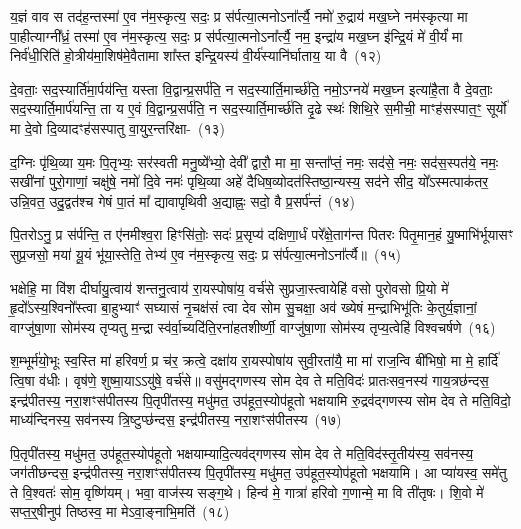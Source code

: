 य॒ज्ञं वाव स तद॑ह॒न्तस्मा॑ ए॒व न॑म॒स्कृत्य॒ सदः॒ प्र स॑र्पत्या॒त्मनो\-ऽना᳚र्त्यै॒ नमो॑ रु॒द्राय॑ मख॒घ्ने नम॑स्कृत्या मा पा॒हीत्याग्नी᳚ध्रं॒ तस्मा॑ ए॒व न॑म॒स्कृत्य॒ सदः॒ प्र स॑र्पत्या॒त्मनो\-ऽना᳚र्त्यै॒ नम॒ इन्द्रा॑य मख॒घ्न इ॑न्द्रि॒यं मे॑ वी॒र्यं॑ मा निर्व॑धी॒रिति॑ हो॒त्रीय॑मा॒शिष॑मे॒वैतामा शा᳚स्त इन्द्रि॒यस्य॑ वी॒र्य॑स्यानि॑र्घाताय॒ या वै~(१२)\ip

दे॒वताः॒ सद॒स्यार्ति॑मा॒र्पय॑न्ति॒ यस्ता वि॒द्वान्प्र॒सर्प॑ति॒ न सद॒स्यार्ति॒मार्च्छ॑ति॒ नमो॒\-ऽग्नये॑ मख॒घ्न इत्या॑है॒ता वै दे॒वताः॒ सद॒स्यार्ति॒मार्प॑यन्ति॒ ता य ए॒वं वि॒द्वान्प्र॒सर्प॑ति॒ न सद॒स्यार्ति॒मार्च्छ॑ति दृ॒ढे स्थः॑ शिथि॒रे स॒मीची॒ माꣳह॑सस्पात॒ꣳ॒ सूर्यो॑ मा दे॒वो दि॒व्यादꣳह॑सस्पातु वा॒युर॒न्तरि॑क्षा-~(१३)\ip

द॒ग्निः पृ॑थि॒व्या य॒मः पि॒तृभ्यः॒ सर॑स्वती मनु॒ष्ये᳚भ्यो॒ देवी᳚ द्वारौ॒ मा मा॒ सन्ता᳚प्तं॒ नमः॒ सद॑से॒ नमः॒ सद॑स॒स्पत॑ये॒ नमः॒ सखी॑नां पुरो॒गाणां॒ चक्षु॑षे॒ नमो॑ दि॒वे नमः॑ पृथि॒व्या अहे॑ दैधिष॒व्योदत॑स्तिष्ठा॒न्यस्य॒ सद॑ने सीद॒ यो᳚\-ऽस्मत्पाक॑तर॒ उन्नि॒वत॒ उदु॒द्वत॑श्च गेषं पा॒तं मा᳚ द्यावा\-पृथिवी अ॒द्याह्नः॒ सदो॒ वै प्र॒सर्प॑न्तं~(१४)\ip

पि॒तरो\-ऽनु॒ प्र स॑र्पन्ति॒ त ए॑नमीश्व॒रा हिꣳसि॑तोः॒ सदः॑ प्र॒सृप्य॑ दक्षिणा॒र्धं परे᳚क्षे॒ताग॑न्त पितरः पितृ॒मान॒हं यु॒ष्माभि॑र्भूयासꣳ सुप्र॒जसो॒ मया॑ यू॒यं भू॑या॒स्तेति॒ तेभ्य॑ ए॒व न॑म॒स्कृत्य॒ सदः॒ प्र स॑र्पत्या॒त्मनो\-ऽना᳚र्त्यै॥~(१५)\ip

{\anuvakamend[{म॒खो वा अ॒न्तरि॑क्षात्प्र॒सर्प॑न्त॒न्त्रय॑स्त्रिꣳशच्च}]}

भक्षेहि॒ मा वि॑श दीर्घायु॒त्वाय॑ शन्तनु॒त्वाय॑ रा॒यस्पोषा॑य॒ वर्च॑से सुप्रजा॒स्त्वायेहि॑ वसो पुरोवसो प्रि॒यो मे॑ हृ॒दो᳚\-ऽस्य॒श्विनो᳚स्त्वा बा॒हुभ्याꣳ॑ सघ्यासं नृ॒चक्ष॑सं त्वा देव सोम सु॒चक्षा॒ अव॑ ख्येषं म॒न्द्राभिभू॑तिः के॒तुर्य॒ज्ञानां॒ वाग्जु॑षा॒णा सोम॑स्य तृप्यतु म॒न्द्रा स्व॑र्वा॒च्यदि॑ति॒रना॑हतशीर्ष्णी॒ वाग्जु॑षा॒णा सोम॑स्य तृप्य॒त्वेहि॑ विश्वचर्\mbox{}षणे~(१६)\ip

श॒म्भूर्म॑यो॒भूः स्व॒स्ति मा॑ हरिवर्ण॒ प्र च॑र॒ क्रत्वे॒ दक्षा॑य रा॒यस्पोषा॑य सुवी॒रता॑यै॒ मा मा॑ राज॒न्वि बी॑भिषो॒ मा मे॒ हार्दि॑ त्वि॒षा व॑धीः। वृष॑णे॒ शुष्मा॒या\-ऽऽ\-यु॑षे॒ वर्च॑से॥ वसु॑मद्गणस्य सोम देव ते मति॒विदः॑ प्रातःसव॒नस्य॑ गाय॒त्रछ॑न्दस॒ इन्द्र॑पीतस्य॒ नरा॒शꣳस॑पीतस्य पि॒तृपी॑तस्य॒ मधु॑मत॒ उप॑हूत॒स्योप॑हूतो भक्षयामि रु॒द्रव॑द्गणस्य सोम देव ते मति॒विदो॒ माध्य॑न्दिनस्य॒ सव॑नस्य त्रि॒ष्टुप्छ॑न्दस॒ इन्द्र॑पीतस्य॒ नरा॒शꣳस॑पीतस्य~(१७)\ip

पि॒तृपी॑तस्य॒ मधु॑मत॒ उप॑हूत॒स्योप॑हूतो भक्षयाम्यादि॒त्यव॑द्गणस्य सोम देव ते मति॒विद॑स्तृ॒तीय॑स्य॒ सव॑नस्य॒ जग॑तीछन्दस॒ इन्द्र॑पीतस्य॒ नरा॒शꣳस॑पीतस्य पि॒तृपी॑तस्य॒ मधु॑मत॒ उप॑हूत॒स्योप॑हूतो भक्षयामि। आ प्या॑यस्व॒ समे॑तु ते वि॒श्वतः॑ सोम॒ वृष्णि॑यम्। भवा॒ वाज॑स्य सङ्ग॒थे। हिन्व॑ मे॒ गात्रा॑ हरिवो ग॒णान्मे॒ मा वि ती॑तृषः। शि॒वो मे॑ सप्त॒र्॒\mbox{}षीनुप॑ तिष्ठस्व॒ मा मे\-ऽवा॒ङ्नाभि॒मति॑~(१८)\ip

